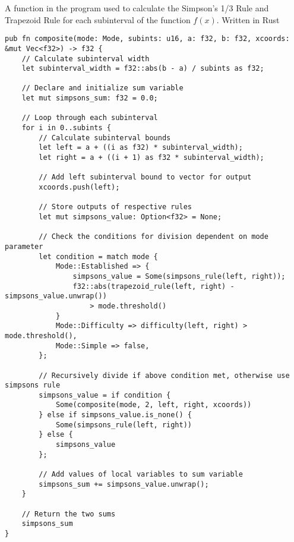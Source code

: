 \documentclass[../IA.tex]{subfiles}
\begin{document}
\begin{listing}[!ht]
\centering
{}
\caption{A function in the program used to calculate the Simpson's 1/3 Rule and Trapezoid Rule for each subinterval of the function \(f(x)\). Written in Rust}
\label{lst:rust_composite}
\begin{verbatim}
pub fn composite(mode: Mode, subints: u16, a: f32, b: f32, xcoords: &mut Vec<f32>) -> f32 {
    // Calculate subinterval width
    let subinterval_width = f32::abs(b - a) / subints as f32;

    // Declare and initialize sum variable
    let mut simpsons_sum: f32 = 0.0;

    // Loop through each subinterval
    for i in 0..subints {
        // Calculate subinterval bounds
        let left = a + ((i as f32) * subinterval_width);
        let right = a + ((i + 1) as f32 * subinterval_width);

        // Add left subinterval bound to vector for output
        xcoords.push(left);

        // Store outputs of respective rules
        let mut simpsons_value: Option<f32> = None;

        // Check the conditions for division dependent on mode parameter
        let condition = match mode {
            Mode::Established => {
                simpsons_value = Some(simpsons_rule(left, right));
                f32::abs(trapezoid_rule(left, right) - simpsons_value.unwrap())
                    > mode.threshold()
            }
            Mode::Difficulty => difficulty(left, right) > mode.threshold(),
            Mode::Simple => false,
        };

        // Recursively divide if above condition met, otherwise use simpsons rule
        simpsons_value = if condition {
            Some(composite(mode, 2, left, right, xcoords))
        } else if simpsons_value.is_none() {
            Some(simpsons_rule(left, right))
        } else {
            simpsons_value
        };

        // Add values of local variables to sum variable
        simpsons_sum += simpsons_value.unwrap();
    }

    // Return the two sums
    simpsons_sum
}
\end{verbatim}
\end{listing}
\end{document}

